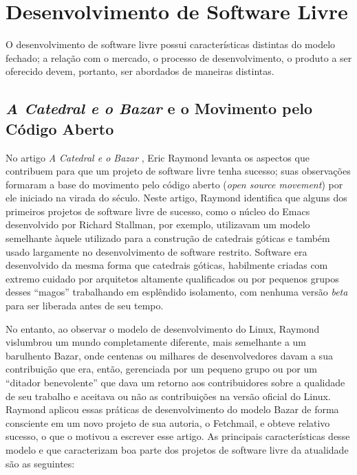 \section{Desenvolvimento de Software Livre}

O desenvolvimento de software livre possui características distintas do
modelo fechado; a relação com o mercado, o processo de
desenvolvimento, o produto a ser oferecido devem, portanto, ser
abordados de maneiras distintas.


\subsection{\emph{A Catedral e o Bazar} e o Movimento pelo Código Aberto}

No artigo \emph{A Catedral e o Bazar} \cite{CATHEDRAL}, Eric Raymond
levanta os aspectos que contribuem para que um projeto de software
livre tenha sucesso; suas observações formaram a base do movimento pelo
código aberto (\emph{open source movement}) por ele iniciado na virada do século.
% 
Neste artigo, Raymond identifica que alguns dos primeiros projetos de software livre
de sucesso, como o núcleo do Emacs desenvolvido por Richard Stallman, por exemplo, utilizavam 
um modelo semelhante àquele utilizado para a construção de catedrais góticas e também usado 
largamente no desenvolvimento de software restrito.
%
Software era desenvolvido da mesma forma que catedrais góticas, habilmente 
criadas com extremo cuidado por arquitetos altamente qualificados ou por pequenos grupos 
desses ``magos'' trabalhando em esplêndido isolamento, com nenhuma versão \emph{beta} para 
ser liberada antes de seu tempo.

No entanto, ao observar o modelo de desenvolvimento do Linux, Raymond vislumbrou um mundo
completamente diferente, mais semelhante a um barulhento Bazar, onde centenas ou milhares de
desenvolvedores davam a sua contribuição que era, então, gerenciada por um pequeno grupo ou por
um ``ditador benevolente'' que dava um retorno aos contribuidores sobre a qualidade de seu trabalho
e aceitava ou não as contribuições na versão oficial do Linux.
%
Raymond aplicou essas práticas de desenvolvimento do modelo Bazar de forma consciente
em um novo projeto de sua autoria, o Fetchmail, e obteve relativo sucesso, o que o
motivou a escrever esse artigo. As principais características desse modelo e que
caracterizam boa parte dos projetos de software livre da atualidade são as seguintes:

